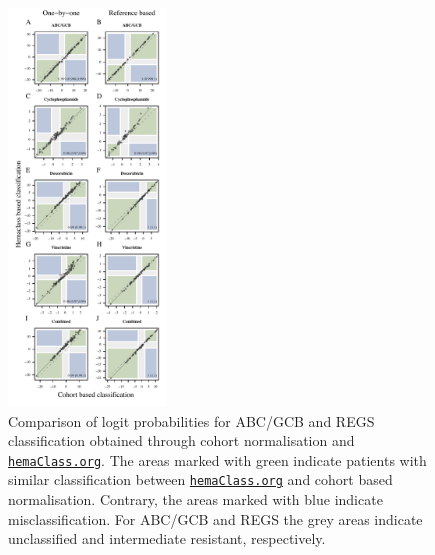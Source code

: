 \documentclass{article}
\newcommand{\hemaClass}{\href{http://hemaClass.org}{\texttt{hemaClass.org}}}
\begin{document}
\begin{figure}
\begin{center}
\includegraphics[width=0.375\textwidth]{DruglogitChep.pdf}
\end{center}
\caption{Comparison of logit probabilities for ABC/GCB and REGS classification obtained through cohort normalisation and \hemaClass{}.
The areas marked with green indicate patients with similar classification between \hemaClass{} and cohort based normalisation.
Contrary, the areas marked with blue indicate misclassification.
For ABC/GCB and REGS the grey areas indicate unclassified and intermediate resistant, respectively.}
\label{fig:ABCGCBDrug}
\end{figure}
\end{document}
